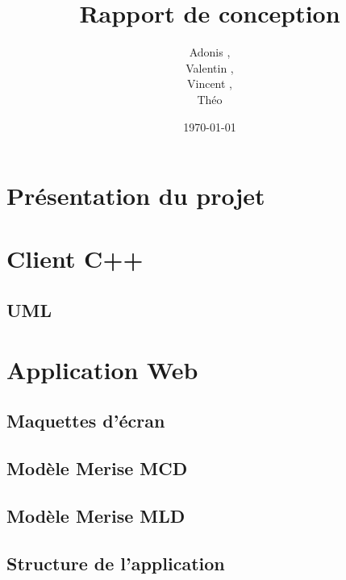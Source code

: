 \documentclass[a4paper]{article}
\title{Rapport de conception}
\author{Adonis \bsc{Najimi},\\
 Valentin \bsc{Stern},\\
 Vincent \bsc{Albert},\\
 Théo \bsc{Gerriet}}
\date{\today}
\begin{document}
\maketitle
\section{Présentation du projet}
\section{Client C++}
\subsection{UML}
\section{Application Web}
\subsection{Maquettes d'écran}

\subsection{Modèle Merise MCD}

\subsection{Modèle Merise MLD}

\subsection{Structure de l'application}

\end{document}
